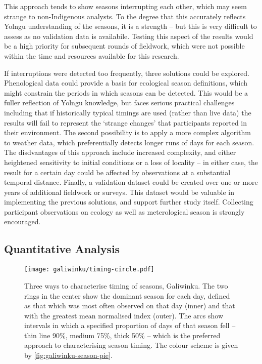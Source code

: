 This approach tends to show seasons interrupting each other, which may
seem strange to non-Indigenous analysts.  To the degree that this accurately
reflects Yolngu understanding of the seasons, it is a strength -- but this is
very difficult to assess as no validation data is availabile.  Testing this aspect of the
results would be a high priority for subsequent rounds of fieldwork, which
were not possible within the time and resources available for this research.

If interruptions were detected too frequently, three solutions could be explored.
Phenological data could provide a basis for ecological season definitions,
which might constrain the periods in which seasons can be detected.
This would be a fuller reflection of Yolngu knowledge, but faces serious
practical challenges including that if historically typical timings are used
(rather than live data) the results will fail to represent the `strange changes'
that participants reported in their environment.
%
The second possibility is to apply a more complex algorithm to weather data,
which preferentially detects longer runs of days for each season.  The disdvantages
of this approach include increased complexity, and either heightened sensitivity
to initial conditions or a loss of locality -- in either case, the result for
a certain day could be affected by observations at a substantial temporal distance.
%
Finally, a validation dataset could be created over one or more years of
additional fieldwork or surveys.  This dataset would be valuable in
implementing the previous solutions, and support further study itself.
Collecting participant observations on ecology as well as meterological
season is strongly encouraged.


\subsection{Quantitative Analysis}
\label{subsec:disc-season-characterisation}

\begin{figure}[p]
    \centerline{
    \texttt{[image: galiwinku/timing-circle.pdf]}}
    \caption[Three ways to characterise timing of seasons, Galiwinku]{
        Three ways to characterise timing of seasons, Galiwinku.
        The two rings in the center show the dominant season for each day,
        defined as that which was most often observed on that day (inner)
        and that with the greatest mean normalised index (outer).
        The arcs show intervals in which a specified proportion of days
        of that season fell -- thin line 90\%, medium 75\%, thick 50\% --
        which is the preferred approach to characterising season timing.
        The colour scheme is given by \cref{fig:galiwinku-season-pie}.
        }
    \label{fig:galiwinku-timing-circle}
\end{figure}

